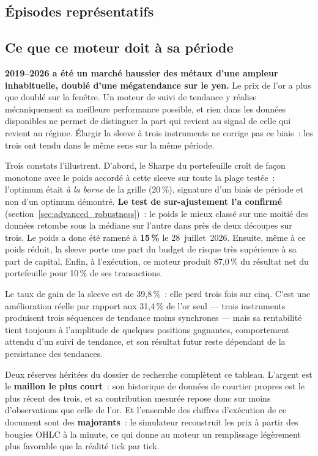 \subsection{Épisodes représentatifs}



\subsection{Ce que ce moteur doit à sa période}

\begin{warningbox}
\textbf{2019--2026 a été un marché haussier des métaux d'une ampleur inhabituelle, doublé d'une mégatendance sur le yen.} Le prix de l'or a plus que doublé sur la fenêtre. Un moteur de suivi de tendance y réalise mécaniquement sa meilleure performance possible, et rien dans les données disponibles ne permet de distinguer la part qui revient au signal de celle qui revient au régime. Élargir la sleeve à trois instruments ne corrige pas ce biais~: les trois ont tendu dans le même sens sur la même période.

Trois constats l'illustrent. D'abord, le Sharpe du portefeuille croît de façon monotone avec le poids accordé à cette sleeve sur toute la plage testée~: l'optimum était \emph{à la borne} de la grille (20\,\%), signature d'un biais de période et non d'un optimum démontré. \textbf{Le test de sur-ajustement l'a confirmé} (section~\ref{sec:advanced_robustness})~: le poids le mieux classé sur une moitié des données retombe sous la médiane sur l'autre dans près de deux découpes sur trois. Le poids a donc été ramené à \textbf{15\,\%} le 28~juillet~2026. Ensuite, même à ce poids réduit, la sleeve porte une part du budget de risque très supérieure à sa part de capital. Enfin, à l'exécution, ce moteur produit 87,0\,\% du résultat net du portefeuille pour 10\,\% de ses transactions.

Le taux de gain de la sleeve est de 39,8\,\%~: elle perd trois fois sur cinq. C'est une amélioration réelle par rapport aux 31,4\,\% de l'or seul --- trois instruments produisent trois séquences de tendance moins synchrones --- mais sa rentabilité tient toujours à l'amplitude de quelques positions gagnantes, comportement attendu d'un suivi de tendance, et son résultat futur reste dépendant de la persistance des tendances.

Deux réserves héritées du dossier de recherche complètent ce tableau. L'argent est le \textbf{maillon le plus court}~: son historique de données de courtier propres est le plus récent des trois, et sa contribution mesurée repose donc sur moins d'observations que celle de l'or. Et l'ensemble des chiffres d'exécution de ce document sont des \textbf{majorants}~: le simulateur reconstruit les prix à partir des bougies OHLC à la minute, ce qui donne au moteur un remplissage légèrement plus favorable que la réalité tick par tick.
\end{warningbox}
